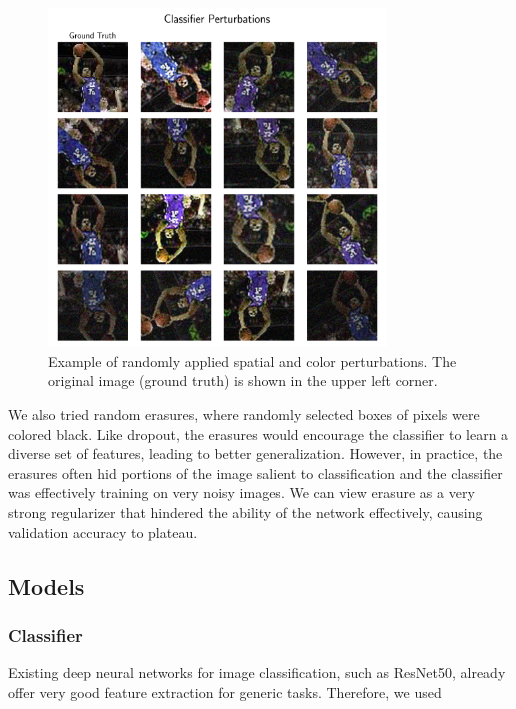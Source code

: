 \documentclass[justified]{article}
\begin{document}
  \begin{figure}[H]
    \centering
    \includegraphics[width=0.8\textwidth]{figures/perturb.png}
    \caption{
      Example of randomly applied spatial and color perturbations.
      The original image (ground truth) is shown in the upper left corner.
    }
  \end{figure}

  We also tried random erasures, where randomly selected boxes of pixels were colored black.
  Like dropout, the erasures would encourage the classifier to learn a diverse set of features, leading to better generalization.
  However, in practice, the erasures often hid portions of the image salient to classification and the classifier was effectively training on very noisy images.
  We can view erasure as a very strong regularizer that hindered the ability of the network effectively, causing validation accuracy to plateau.

  \subsection{Models}

  \subsubsection{Classifier}

  Existing deep neural networks for image classification, such as ResNet50, already offer very good feature extraction for generic tasks.
  Therefore, we used
\end{document}
